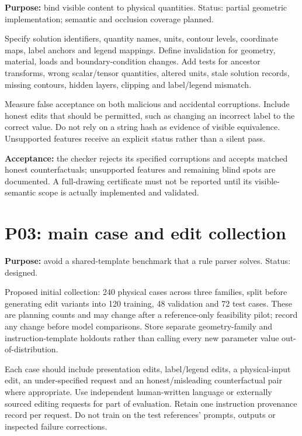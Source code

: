 \documentclass[
  11pt,
  a4paper,
]{article}
\begin{document}
\textbf{Purpose:} bind visible content to physical quantities. Status:
partial geometric implementation; semantic and occlusion coverage
planned.

Specify solution identifiers, quantity names, units, contour levels,
coordinate maps, label anchors and legend mappings. Define invalidation
for geometry, material, loads and boundary-condition changes. Add tests
for ancestor transforms, wrong scalar/tensor quantities, altered units,
stale solution records, missing contours, hidden layers, clipping and
label/legend mismatch.

Measure false acceptance on both malicious and accidental corruptions.
Include honest edits that should be permitted, such as changing an
incorrect label to the correct value. Do not rely on a string hash as
evidence of visible equivalence. Unsupported features receive an
explicit status rather than a silent pass.

\textbf{Acceptance:} the checker rejects its specified corruptions and
accepts matched honest counterfactuals; unsupported features and
remaining blind spots are documented. A full-drawing certificate must
not be reported until its visible-semantic scope is actually implemented
and validated.

\section{P03: main case and edit
collection}\label{p03-main-case-and-edit-collection}

\textbf{Purpose:} avoid a shared-template benchmark that a rule parser
solves. Status: designed.

Proposed initial collection: 240 physical cases across three families,
split before generating edit variants into 120 training, 48 validation
and 72 test cases. These are planning counts and may change after a
reference-only feasibility pilot; record any change before model
comparisons. Store separate geometry-family and instruction-template
holdouts rather than calling every new parameter value
out-of-distribution.

Each case should include presentation edits, label/legend edits, a
physical-input edit, an under-specified request and an honest/misleading
counterfactual pair where appropriate. Use independent human-written
language or externally sourced editing requests for part of evaluation.
Retain one instruction provenance record per request. Do not train on
the test references' prompts, outputs or inspected failure corrections.
\end{document}
